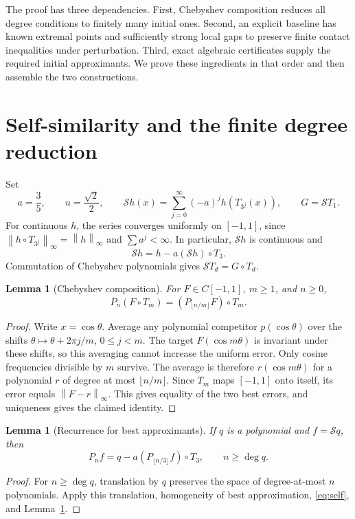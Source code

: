 \documentclass[11pt]{article}
\newtheorem{lemma}[theorem]{Lemma}
\theoremstyle{remark}\newtheorem{remark}[theorem]{Remark}
\newcommand{\norm}[1]{\left\|#1\right\|_\infty}
\begin{document}
The proof has three dependencies. First, Chebyshev composition reduces all
degree conditions to finitely many initial ones. Second, an explicit
baseline has known extremal points and sufficiently strong local gaps to
preserve finite contact inequalities under perturbation. Third, exact
algebraic certificates supply the required initial approximants. We prove
these ingredients in that order and then assemble the two constructions.

\section{Self-similarity and the finite degree reduction}

Set
\[
 a=\frac35,\qquad u=\frac{\sqrt2}{2},\qquad
 \mathcal S h(x)=\sum_{j=0}^{\infty}(-a)^j h(T_{3^j}(x)),
 \qquad G=\mathcal S T_1.
\]
For continuous $h$, the series converges uniformly on $[-1,1]$, since
$\norm{h\circ T_{3^j}}=\norm h$ and $\sum a^j<\infty$. In particular,
$\mathcal S h$ is continuous and
\begin{equation}\label{eq:self}
 \mathcal S h=h-a(\mathcal S h)\circ T_3.
\end{equation}
Commutation of Chebyshev polynomials gives
$\mathcal S T_d=G\circ T_d$.

\begin{lemma}[Chebyshev composition]\label{lem:composition}
For $F\in C[-1,1]$, $m\ge1$, and $n\ge0$,
\[
 P_n(F\circ T_m)=(P_{\lfloor n/m\rfloor}F)\circ T_m.
\]
\end{lemma}
\begin{proof}
Write $x=\cos\theta$. Average any polynomial competitor $p(\cos\theta)$
over the shifts $\theta\mapsto\theta+2\pi j/m$, $0\le j<m$. The target
$F(\cos m\theta)$ is invariant under these shifts, so this averaging
cannot increase the uniform error. Only cosine frequencies divisible by
$m$ survive. The average is therefore $r(\cos m\theta)$ for a polynomial
$r$ of degree at most $\lfloor n/m\rfloor$. Since $T_m$ maps $[-1,1]$
onto itself, its error equals $\norm{F-r}$. This gives equality of the two
best errors, and uniqueness gives the claimed identity.
\end{proof}

\begin{lemma}[Recurrence for best approximants]\label{lem:recurrence}
If $q$ is a polynomial and $f=\mathcal S q$, then
\begin{equation}\label{eq:bestrec}
 P_n f=q-a(P_{\lfloor n/3\rfloor}f)\circ T_3,
 \qquad n\ge\deg q.
\end{equation}
\end{lemma}
\begin{proof}
For $n\ge\deg q$, translation by $q$ preserves the space of degree-at-most
$n$ polynomials. Apply this translation, homogeneity of best approximation,
\eqref{eq:self}, and Lemma~\ref{lem:composition}.
\end{proof}
\end{document}
